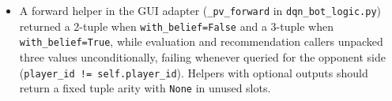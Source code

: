 \begin{itemize}
        \texttt{ends} local and raising \texttt{UnboundLocalError} the first time a game finished.
        An 8-ply unit-test rollout never reached the end of a game (\texttt{if not done.any():
        return}) and so passed. Replacing the rebinding with in-place \texttt{ends.add\_(...)} and
        setting \texttt{max\_plies=6} in the smoke test so games terminate during rollout caught
        the path on both initial training and checkpoint resume.
  \item A forward helper in the GUI adapter (\texttt{\_pv\_forward} in \texttt{dqn\_bot\_logic.py})
        returned a 2-tuple when \texttt{with\_belief=False} and a 3-tuple when
        \texttt{with\_belief=True}, while evaluation and recommendation callers unpacked three
        values unconditionally, failing whenever queried for the opponent side
        (\texttt{player\_id != self.player\_id}). Helpers with optional outputs should return a
        fixed tuple arity with \texttt{None} in unused slots.
\end{itemize}
